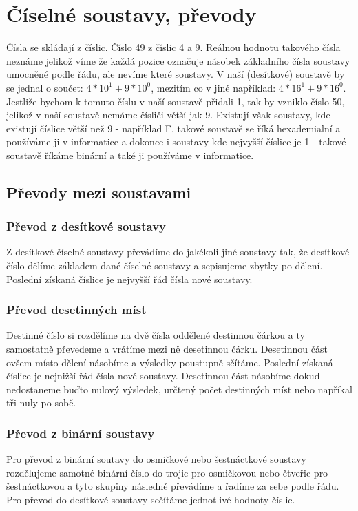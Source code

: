 \section{Číselné soustavy, převody}
\label{sec:ciselnesoustavy}
Čísla se skládají z číslic.
Číslo 49 z číslic 4 a 9.
Reálnou hodnotu takového čísla neznáme jelikož víme že každá pozice označuje násobek základního čísla soustavy umocněné podle řádu, ale nevíme které soustavy.
V naší (desítkové) soustavě by se jednal o součet: $4*10^1 + 9*10^0$, mezitím co v jiné například: $4*16^1 + 9*16^0$. 
Jestliže bychom k tomuto číslu v naší soustavě přidali 1, tak by vzniklo číslo 50, jelikož v naší soustavě nemáme čísliči větší jak 9.
Existují však soustavy, kde existují číslice větší než 9 - například F, takové soustavě se říká hexademialní a používáme ji v informatice a dokonce i soustavy kde nejvyšší číslice je 1 - takové soustavě říkáme binární a také ji používáme v informatice.
\subsection{Převody mezi soustavami}
\subsubsection{Převod z desítkové soustavy}
Z desítkové číselné soustavy převádíme do jakékoli jiné soustavy tak, že desítkové číslo dělíme základem dané číselné soustavy a sepisujeme zbytky po dělení.
Poslední získaná číslice je nejvyšší řád čísla nové soustavy.
\subsubsection{Převod desetinných míst}
Destinné číslo si rozdělíme na dvě čísla oddělené destinnou čárkou a ty samostatně převedeme a vrátíme mezi ně desetinnou čárku.
Desetinnou část ovšem místo dělení násobíme a výsledky poustupně sčítáme.
Poslední získaná číslice je nejnižší řád čísla nové soustavy.
Desetinnou část násobíme dokud nedostaneme buďto nulový výsledek, určtený počet destinných míst nebo napříkal tři nuly po sobě.
\subsubsection{Převod z binární soustavy}
Pro převod z binární soutavy do osmičkové nebo šestnáctkové soustavy rozdělujeme samotné binární číslo do trojic pro osmičkovou nebo čtveřic pro šestnáctkovou a tyto skupiny následně převádíme a řadíme za sebe podle řádu.
Pro převod do desítkové soustavy sečítáme jednotlivé hodnoty číslic.
